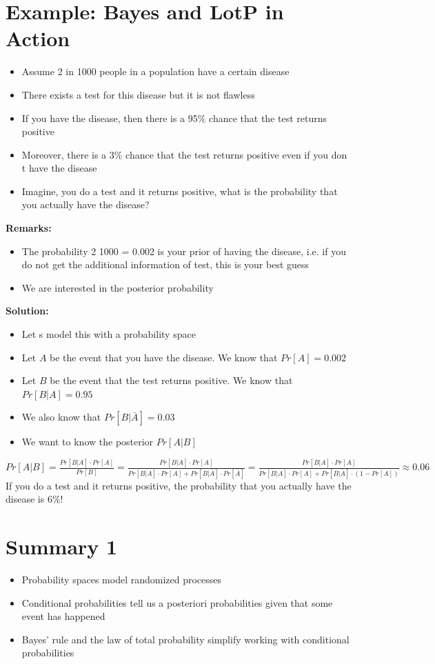 	\section{Example: Bayes and LotP in Action}
		\begin{itemize}
			\item Assume 2 in 1000 people in a population have a certain disease
			\item There exists a test for this disease but it is not flawless
			\item If you have the disease, then there is a 95$\%$ chance that the test returns positive
			\item Moreover, there is a 3$\%$ chance that the test returns positive even if you don t have the disease
			\item Imagine, you do a test and it returns positive, what is the probability that you actually have the disease?
		\end{itemize}
		\textbf{Remarks:}
		\begin{itemize}
			\item The probability 2 1000 = 0.002 is your prior of having the disease, i.e. if you do not get the additional information of test, this is your best guess
			\item We are interested in the posterior probability
		\end{itemize}
		\textbf{Solution:}
		\begin{itemize}
			\item Let s model this with a probability space
			\item Let $A$ be the event that you have the disease. We know that $Pr[A] = 0.002$
			\item Let $B$ be the event that the test returns positive. We know that $Pr[B|A] = 0.95$
			\item We also know that $Pr[B|\bar{A}] = 0.03$
			\item We want to know the posterior $Pr[A|B]$
		\end{itemize}
		$Pr[A|B] = \frac{Pr[B|A] \cdot Pr[A]}{Pr[B]} = \frac{Pr[B|A] \cdot Pr[A]}{Pr[B|A] \cdot Pr[A] + Pr[B|\bar{A}] \cdot Pr[\bar{A}]} 
		= \frac{Pr[B|A] \cdot Pr[A]}{Pr[B|A] \cdot Pr[A] + Pr[B|\bar{A}] \cdot (1-Pr[A])} \approx 0.06$\\
		
		If you do a test and it returns positive, the probability that you actually have the disease is $6\%$!
		
	\section{Summary 1}
		\begin{itemize}
			\item Probability spaces model randomized processes
			\item Conditional probabilities tell us a posteriori probabilities given that some event has happened
			\item Bayes’ rule and the law of total probability simplify working with conditional probabilities
		\end{itemize}

